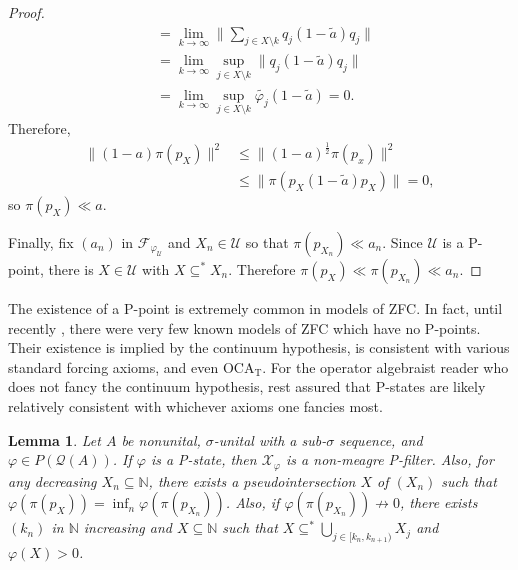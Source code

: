 \documentclass[10pt]{amsart}
\newtheorem{lem}[thm]{Lemma}
\theoremstyle{definition}
\newcommand{\Xp}{\mathscr{X}_\varphi}
\newcommand{\U}{\mathscr{U}}
\begin{document}
\begin{proof}
\begin{align*}
        &= \lim_{k\rightarrow\infty}\|\sum_{j\in X\setminus k}q_j(1-\tilde{a})q_j\|\\
        &= \lim_{k\rightarrow\infty}\sup_{j\in X\setminus k}\|q_j(1-\tilde{a})q_j\| \\
        &= \lim_{k\rightarrow\infty}\sup_{j\in X\setminus k}\tilde{\varphi_j}(1-\tilde{a}) =0.
    \end{align*}
    Therefore,
    \begin{align*}
        \|(1-a)\pi(p_X)\|^2 &\leq \|(1-a)^\frac{1}{2}\pi(p_x)\|^2 \\
        &\leq \|\pi(p_X(1-\tilde{a})p_X)\|=0,
    \end{align*}
    so $\pi(p_X)\ll a$.

    Finally, fix $(a_n)$ in $\mathscr{F}_{\varphi_\U}$ and $X_n\in\mathscr{U}$ so that $\pi(p_{X_n})\ll a_n$. Since $\U$ is a P-point, there is $X\in\U$ with $X\subseteq^* X_n$. Therefore $\pi(p_X)\ll \pi(p_{X_n})\ll a_n$.
\end{proof}

The existence of a P-point is extremely common in models of ZFC. In fact, until recently \cite{CH19}, there were very few known models of ZFC which have no P-points. Their existence is implied by the continuum hypothesis, is consistent with various standard forcing axioms, and even $\text{OCA}_\text{T}$. For the operator algebraist reader who does not fancy the continuum hypothesis, rest assured that P-states are likely relatively consistent with whichever axioms one fancies most.

\begin{lem}\label{extremepain}
    Let $A$ be nonunital, $\sigma$-unital with a sub-$\sigma$ sequence, and $\varphi\in P(\mathscr{Q}(A))$. If $\varphi$ is a P-state, then $\Xp$ is a non-meagre P-filter. Also, for any decreasing $X_n\subseteq\mathbb{N}$, there exists a pseudointersection $X$ of $(X_n)$ such that $\varphi(\pi(p_X))=\inf_n\varphi(\pi(p_{X_n}))$. Also, if $\varphi(\pi(p_{X_n}))\not\rightarrow0$, there exists $(k_n)$ in $\mathbb{N}$ increasing and $X\subseteq\mathbb{N}$ such that $X\subseteq^*\bigcup_{j\in [k_n,k_{n+1})}X_j$ and $\varphi(X)>0$.
\end{lem}
\end{document}
